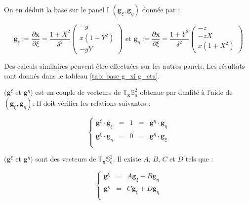 On en déduit la base sur le panel I $\left( \mathbf{g}_{\xi}, \mathbf{g}_{\eta} \right)$ donnée par :

\begin{equation}
\mathbf{g}_{\xi} := \dfrac{\partial \mathbf{x}}{\partial \xi}= \dfrac{1+X^2}{\delta^2} \begin{pmatrix}
-y \\ x(1+Y^2) \\ -yY
\end{pmatrix} \text{ et } \mathbf{g}_{\eta} := \dfrac{\partial \mathbf{x}}{\partial \xi}= \dfrac{1+Y^2}{\delta^2} \begin{pmatrix}
-z \\ -zX \\ x(1+X^2)
\end{pmatrix}
\label{eq: base locale I}
\end{equation}

Des calculs similaires peuvent être effectuées sur les autres panels. Les résultats sont donnés dans le tableau \ref{tab: base g_xi g_eta}.

$(\mathbf{g}^{\xi}$ et $\mathbf{g}^{\eta})$ est un couple de vecteurs de $\mathbb{T}_{\mathbf{x}}\mathbb{S}_a^2$ obtenue par dualité à l'aide de $(\mathbf{g}_{\xi}, \mathbf{g}_{\eta})$. Il doit vérifier les relations suivantes :

\begin{equation}
\left\lbrace
\begin{array}{rcccl}
\mathbf{g}^{\xi} \cdot \mathbf{g}_{\xi} & = & 1 & = & \mathbf{g}^{\eta} \cdot \mathbf{g}_{\eta} \\
\mathbf{g}^{\xi} \cdot \mathbf{g}_{\eta} & = & 0 & = & \mathbf{g}^{\eta} \cdot \mathbf{g}_{\xi} \\
\end{array}
\right.
\label{eq: normalisation g_xi g_eta}
\end{equation}

$(\mathbf{g}^{\xi}$ et $\mathbf{g}^{\eta})$ sont des vecteurs de $\mathbb{T}_{\mathbf{x}}\mathbb{S}_a^2$. Il existe $A$, $B$, $C$ et $D$ tels que :

\begin{equation}
\left\lbrace
\begin{array}{rcl}
\mathbf{g}^{\xi} & = & A \mathbf{g}_{\xi} + B \mathbf{g}_{\eta} \\
\mathbf{g}^{\eta} & = & C \mathbf{g}_{\xi} + D \mathbf{g}_{\eta} \\
\end{array}
\right.
\label{eq: A B C D}
\end{equation}

